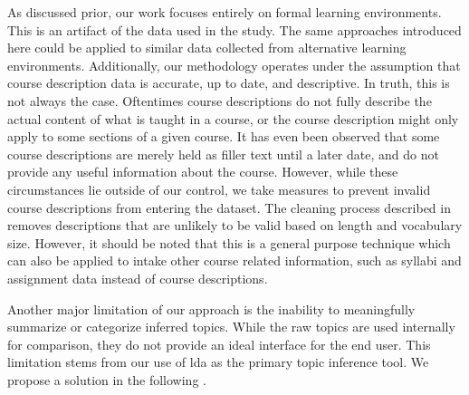 
As discussed prior, our work focuses entirely on formal learning environments.
This is an artifact of the data used in the study.
The same approaches introduced here could be applied to similar data collected from alternative learning environments.
Additionally, our methodology operates under the assumption that course description data is accurate, up to date, and descriptive.
In truth, this is not always the case.
Oftentimes course descriptions do not fully describe the actual content of what is taught in a course, or the course description might only apply to some sections of a given course.
It has even been observed that some course descriptions are merely held as filler text until a later date, and do not provide any useful information about the course.
However, while these circumstances lie outside of our control, we take measures to prevent invalid course descriptions from entering the dataset.
The cleaning process described in  removes descriptions that are unlikely to be valid based on length and vocabulary size.
However, it should be noted that this is a general purpose technique which can also be applied to intake other course related information, such as syllabi and assignment data instead of course descriptions.


Another major limitation of our approach is the inability to meaningfully summarize or categorize inferred topics.
While the raw topics are used internally for comparison, they do not provide an ideal interface for the end user.
This limitation stems from our use of \ac{lda} as the primary topic inference tool.
We propose a solution in the following .

